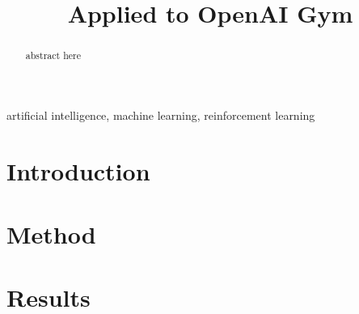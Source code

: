 \documentclass[conference]{IEEEtran}
\begin{document}
\title{{\QLearning} Applied to OpenAI Gym}
\author{
}
\maketitle


\begin{abstract}
    abstract here
\end{abstract}

\begin{IEEEkeywords}
    artificial intelligence, machine learning, reinforcement learning
\end{IEEEkeywords}


\section{Introduction}


\section{Method}



\section{Results}




\end{document}

